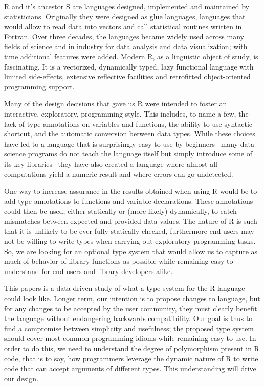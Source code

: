 \documentclass[acmsmall,10pt,review,anonymous]{acmart}\settopmatter{printfolios=true,printccs=false,printacmref=false}
\begin{document}
R and it's ancestor S are languages designed, implemented and maintained by
statisticians. Originally they were designed as glue languages, languages
that would allow to read data into vectors and call statistical routines
written in Fortran. Over three decades, the languages became widely used
across many fields of science and in industry for data analysis and data
visualization; with time additional features were added.  Modern R, as a
linguistic object of study, is fascinating. It is a vectorized, dynamically
typed, lazy functional language with limited side-effects, extensive
reflective facilities and retrofitted object-oriented programming support.

Many of the design decisions that gave us R were intended to foster an
interactive, exploratory, programming style. This includes, to name a few,
the lack of type annotations on variables and functions, the ability to use
syntactic shortcut, and the automatic conversion between data types.  While
these choices have led to a language that is surprisingly easy to use by
beginners --many data science programs do not teach the language itself but
simply introduce some of its key libraries-- they have also created a
language where almost all computations yield a numeric result and where
errors can go undetected. 

One way to increase assurance in the results obtained when using R would be
to add type annotations to functions and variable declarations. These
annotations could then be used, either statically or (more likely)
dynamically, to catch mismatches between expected and provided data values.
The nature of R is such that it is unlikely to be ever fully statically
checked, furthermore end users may not be willing to write types when
carrying out exploratory programming tasks. So, we are looking for an
optional type system that would allow us to capture as much of behavior of
library functions as possible while remaining easy to understand for
end-users and library developers alike.

This papers is a data-driven study of what a type system for the R language
could look like. Longer term, our intention is to propose changes to
language, but for any changes to be accepted by the user community, they
must clearly benefit the language without endangering backwards
compatibility. Our goal is thus to find a compromise between simplicity and
usefulness; the proposed type system should cover most common programming
idioms while remaining easy to use. In order to do this, we need to
understand the degree of polymorphism present in R code, that is to say, how
programmers leverage the dynamic nature of R to write code that can accept
arguments of different types.  This understanding will drive our design.
\end{document}
